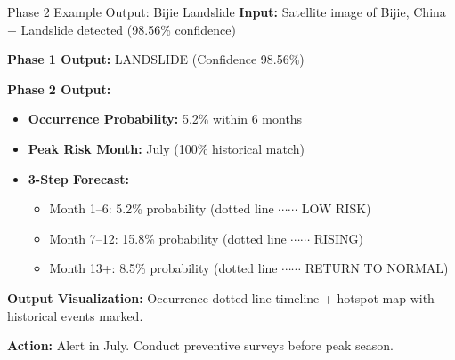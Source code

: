 \documentclass[aspectratio=169]{beamer}
\begin{document}
\begin{frame}{Phase 2 Example Output: Bijie Landslide}
    \textbf{Input:} Satellite image of Bijie, China + Landslide detected (98.56\% confidence)

    \vspace{0.3cm}
    \textbf{Phase 1 Output:} LANDSLIDE (Confidence 98.56\%)
    \vspace{0.1cm}

    \textbf{Phase 2 Output:} \vspace{0.1cm}
    \begin{itemize}
        \item \textbf{Occurrence Probability:} 5.2\% within 6 months
        \item \textbf{Peak Risk Month:} July (100\% historical match)
        \item \textbf{3-Step Forecast:}
        \begin{itemize}
            \item Month 1--6: 5.2\% probability (dotted line $\cdots\cdots$ LOW RISK)
            \item Month 7--12: 15.8\% probability (dotted line $\cdots\cdots$ RISING)
            \item Month 13+: 8.5\% probability (dotted line $\cdots\cdots$ RETURN TO NORMAL)
        \end{itemize}
    \end{itemize}

    \vspace{0.3cm}
    \textbf{Output Visualization:} Occurrence dotted-line timeline + hotspot map with historical events marked.

    \vspace{0.2cm}
    \textbf{Action:} Alert in July. Conduct preventive surveys before peak season.
\end{frame}
\end{document}

